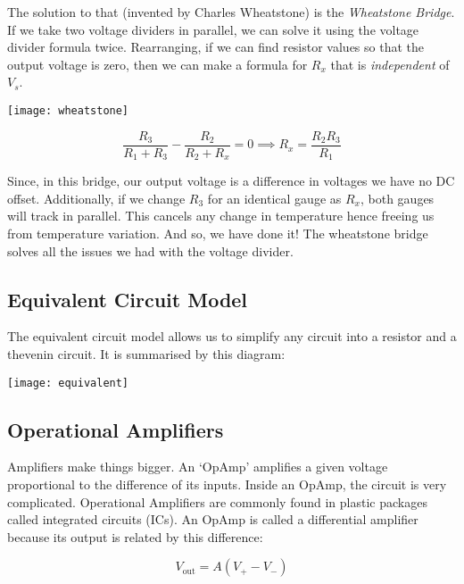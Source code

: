 \documentclass[12pt]{article}
\begin{document}
The solution to that (invented by Charles Wheatstone) is the \textit{Wheatstone Bridge}.
If we take two voltage dividers in parallel, we can solve it using the voltage divider formula twice. 
Rearranging, if we can find resistor values so that the output voltage is zero, then we can make a formula for $R_x$ that is \textit{independent} of $V_s$.

\begin{marginfigure}
  \vspace{ -2cm }
  \texttt{[image: wheatstone]}
\end{marginfigure}

\begin{equation*}
  \frac{R_3}{R_1+R_3} - \frac{R_2}{R_2 + R_x} = 0 \implies R_x = \frac{R_2R_3}{R_1}
\end{equation*}

Since, in this bridge, our output voltage is a difference in voltages we have no DC offset. 
Additionally, if we change $R_3$ for an identical gauge as $R_x$, both gauges will track in parallel.
This cancels any change in temperature hence freeing us from temperature variation.
And so, we have done it! The wheatstone bridge solves all the issues we had with the voltage divider.

\subsection{Equivalent Circuit Model}
The equivalent circuit model allows us to simplify any circuit into a resistor and a thevenin circuit.
It is summarised by this diagram:

\begin{center}
  \texttt{[image: equivalent]}
\end{center}

\subsection{Operational Amplifiers}
Amplifiers make things bigger.
An `OpAmp' amplifies a given voltage proportional to the difference of its inputs.
Inside an OpAmp, the circuit is very complicated.
Operational Amplifiers are commonly found in plastic packages called integrated circuits (ICs).
An OpAmp is called a differential amplifier because its output is related by this difference:

\begin{equation*}
  V_{\text{out}} = A(V_+ - V_-)
\end{equation*}
\end{document}
